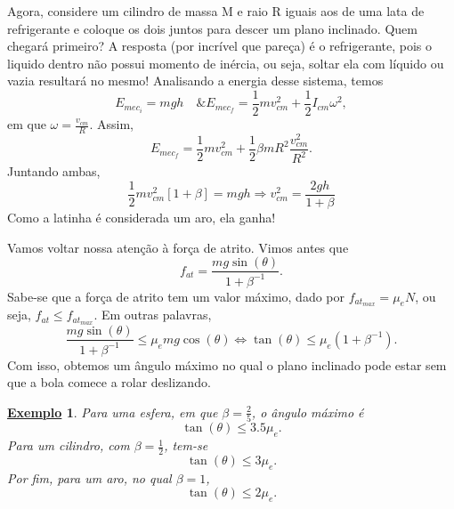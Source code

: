 \documentclass{article}
\newtheorem{example}{\underline{Exemplo}}
\begin{document}
Agora, considere um cilindro de massa M e raio R iguais aos de uma lata de refrigerante e coloque os dois juntos para descer um plano inclinado. Quem chegará primeiro?
A resposta (por incrível que pareça) é o refrigerante, pois o liquido dentro não possui momento de inércia, ou seja, soltar ela com líquido ou vazia resultará no mesmo! Analisando a energia
desse sistema, temos 
\[
  E_{mec_{i}} = mgh\quad \& E_{mec_{f}} = \frac{1}{2}mv_{cm}^{2} + \frac{1}{2}I_{cm}\omega^{2},
\]
em que \(\omega = \frac{v_{cm}}{R}\). Assim, 
\[
  E_{mec_{f}}=\frac{1}{2}mv_{cm}^{2} + \frac{1}{2}\beta mR^{2}\frac{v_{cm}^{2}}{R^{2}}.
\]
Juntando ambas, 
\[
  \frac{1}{2}mv_{cm}^{2}[1+\beta ] = mgh \Rightarrow v_{cm}^{2} = \frac{2gh}{1+\beta }
\]
Como a latinha é considerada um aro, ela ganha!

Vamos voltar nossa atenção à força de atrito. Vimos antes que 
\[
  f_{at} = \frac{mg\sin{(\theta )}}{1 + \beta^{-1}}.
\]
Sabe-se que a força de atrito tem um valor máximo, dado por \(f_{at_{max}} = \mu_{e}N\), ou seja,
\(f_{at}\leq f_{at_{max}}\). Em outras palavras, 
\[
  \frac{mg\sin{(\theta )}}{1+\beta^{-1}}\leq \mu_{e}mg\cos{(\theta )} \Longleftrightarrow \tan{(\theta )}\leq \mu_{e}(1+\beta^{-1}).
\]
Com isso, obtemos um ângulo máximo no qual o plano inclinado pode estar sem que a bola comece a rolar deslizando.
\begin{example}
  Para uma esfera, em que \(\beta =\frac{2}{5}\), o ângulo máximo é 
  \[
    \tan{(\theta )}\leq 3.5\mu_{e}.
  \]
  Para um cilindro, com \(\beta = \frac{1}{2}\), tem-se 
  \[
    \tan{(\theta )}\leq 3\mu_{e}.
  \]
  Por fim, para um aro, no qual \(\beta =1\), 
  \[
    \tan{(\theta )}\leq 2\mu_{e}.
  \]
\end{example}
\end{document}
